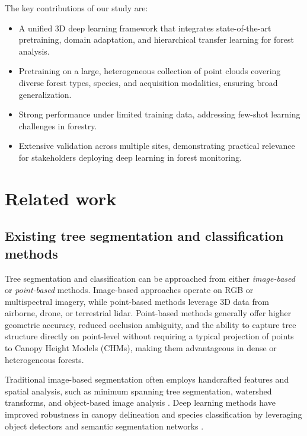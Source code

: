 \documentclass[review,authoryear]{elsarticle}
\begin{document}
The key contributions of our study are:
\begin{itemize}
    \item A unified 3D deep learning framework that integrates state-of-the-art pretraining, domain adaptation, and hierarchical transfer learning for forest analysis.
    \item Pretraining on a large, heterogeneous collection of point clouds covering diverse forest types, species, and acquisition modalities, ensuring broad generalization.
    \item Strong performance under limited training data, addressing few-shot learning challenges in forestry.
    \item Extensive validation across multiple sites, demonstrating practical relevance for stakeholders deploying deep learning in forest monitoring.
\end{itemize}

\section{Related work}
\label{sec:related}

\subsection{Existing tree segmentation and classification methods}

Tree segmentation and classification can be approached from either \textit{image-based} or \textit{point-based} methods. Image-based approaches operate on RGB or multispectral imagery, while point-based methods leverage 3D data from airborne, drone, or terrestrial lidar. Point-based methods generally offer higher geometric accuracy, reduced occlusion ambiguity, and the ability to capture tree structure directly on point-level without requiring a typical projection of points to Canopy Height Models (CHMs), making them advantageous in dense or heterogeneous forests.

Traditional image-based segmentation often employs handcrafted features and spatial analysis, such as minimum spanning tree segmentation, watershed transforms, and object-based image analysis \citep{BLASCHKE2014180, QIN2022113143}. Deep learning methods have improved robustness in canopy delineation and species classification by leveraging object detectors and semantic segmentation networks \citep{Weinstein2020DeepForest, Ball2023Detectree2, Chen2025ZeroShotTree}.
\end{document}
